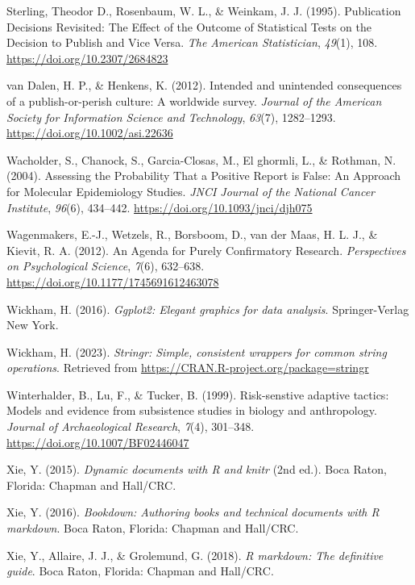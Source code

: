 \documentclass[
  ,man,mask,floatsintext]{apa6}
\newlength{\cslhangindent}
\newlength{\cslentryspacingunit} %
\newenvironment{CSLReferences}[2] %
 {%
  \setlength{\parindent}{0pt}
  \ifodd #1
  \let\oldpar\par
  \def\par{\hangindent=\cslhangindent\oldpar}
  \fi
  \setlength{\parskip}{#2\cslentryspacingunit}
 }%
 {}
\begin{document}
\begin{CSLReferences}{1}{0}
\leavevmode{}%
Sterling, Theodor D., Rosenbaum, W. L., \& Weinkam, J. J. (1995). Publication {Decisions Revisited}: {The Effect} of the {Outcome} of {Statistical Tests} on the {Decision} to {Publish} and {Vice Versa}. \emph{The American Statistician}, \emph{49}(1), 108. \url{https://doi.org/10.2307/2684823}

\leavevmode{}%
van Dalen, H. P., \& Henkens, K. (2012). Intended and unintended consequences of a publish-or-perish culture: {A} worldwide survey. \emph{Journal of the American Society for Information Science and Technology}, \emph{63}(7), 1282--1293. \url{https://doi.org/10.1002/asi.22636}

\leavevmode{}%
Wacholder, S., Chanock, S., Garcia-Closas, M., El ghormli, L., \& Rothman, N. (2004). Assessing the {Probability That} a {Positive Report} is {False}: {An Approach} for {Molecular Epidemiology Studies}. \emph{JNCI Journal of the National Cancer Institute}, \emph{96}(6), 434--442. \url{https://doi.org/10.1093/jnci/djh075}

\leavevmode{}%
Wagenmakers, E.-J., Wetzels, R., Borsboom, D., van der Maas, H. L. J., \& Kievit, R. A. (2012). An {Agenda} for {Purely Confirmatory Research}. \emph{Perspectives on Psychological Science}, \emph{7}(6), 632--638. \url{https://doi.org/10.1177/1745691612463078}

\leavevmode{}%
Wickham, H. (2016). \emph{Ggplot2: {Elegant} graphics for data analysis}. Springer-Verlag New York.

\leavevmode{}%
Wickham, H. (2023). \emph{Stringr: Simple, consistent wrappers for common string operations}. Retrieved from \url{https://CRAN.R-project.org/package=stringr}

\leavevmode{}%
Winterhalder, B., Lu, F., \& Tucker, B. (1999). Risk-senstive adaptive tactics: {Models} and evidence from subsistence studies in biology and anthropology. \emph{Journal of Archaeological Research}, \emph{7}(4), 301--348. \url{https://doi.org/10.1007/BF02446047}

\leavevmode{}%
Xie, Y. (2015). \emph{Dynamic documents with {R} and knitr} (2nd ed.). Boca Raton, Florida: {Chapman and Hall/CRC}.

\leavevmode{}%
Xie, Y. (2016). \emph{Bookdown: {Authoring} books and technical documents with {R} markdown}. Boca Raton, Florida: {Chapman and Hall/CRC}.

\leavevmode{}%
Xie, Y., Allaire, J. J., \& Grolemund, G. (2018). \emph{R markdown: {The} definitive guide}. Boca Raton, Florida: {Chapman and Hall/CRC}.

\end{CSLReferences}
\end{document}
